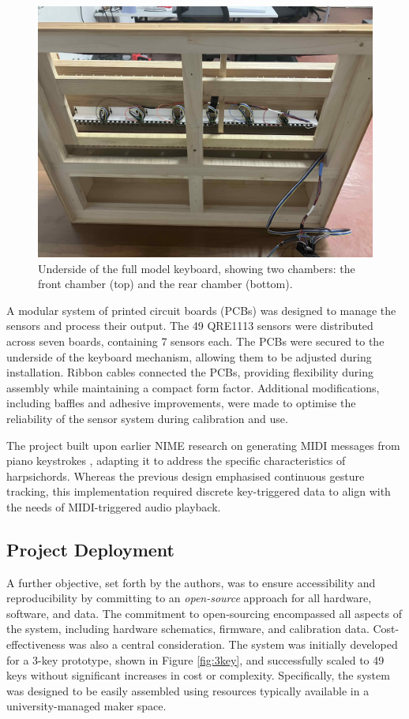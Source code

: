 \begin{figure}  
  \centering
  \includegraphics[width=\linewidth]{src/images/49-key-bottom-sensors-no-keys.jpg} 
  \caption{Underside of the full model keyboard, showing two chambers: the front chamber (top) and the rear chamber (bottom).} 
  \Description{} 
  \label{fig:49-key-bottom}
\end{figure}

A modular system of printed circuit boards (PCBs) was designed to manage the sensors and process their output. The 49 QRE1113 sensors were distributed across seven boards, containing 7 sensors each. The PCBs were secured to the underside of the keyboard mechanism, allowing them to be adjusted during installation. Ribbon cables connected the PCBs, providing flexibility during assembly while maintaining a compact form factor. Additional modifications, including baffles and adhesive improvements, were made to optimise the reliability of the sensor system during calibration and use.


The project built upon earlier NIME research on generating MIDI messages from piano keystrokes \cite{McPherson2013}, adapting it to address the specific characteristics of harpsichords. Whereas the previous design emphasised continuous gesture tracking, this implementation required discrete key-triggered data to align with the needs of MIDI-triggered audio playback. 

\subsection{Project Deployment}
A further objective, set forth by the authors, was to ensure accessibility and reproducibility by committing to an \emph{open-source} approach for all hardware, software, and data. The commitment to open-sourcing encompassed all aspects of the system, including hardware schematics, firmware, and calibration data. Cost-effectiveness was also a central consideration. The system was initially developed for a 3-key prototype, shown in Figure \ref{fig:3key}, and successfully scaled to 49 keys without significant increases in cost or complexity. Specifically, the system was designed to be easily assembled using resources typically available in a university-managed maker space.



